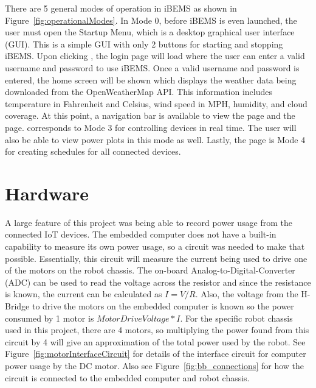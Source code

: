 There are 5 general modes of operation in iBEMS as shown in Figure~\ref{fig:operationalModes}. In Mode 0, before iBEMS is even launched, the user must open the Startup Menu, which is a desktop graphical user interface (GUI). This is a simple GUI with only 2 buttons for starting and stopping iBEMS. Upon clicking , the login page will load where the user can enter a valid username and password to use iBEMS. Once a valid username and password is entered, the home screen will be shown which displays the weather data being downloaded from the OpenWeatherMap API. This information includes temperature in Fahrenheit and Celsius, wind speed in MPH, humidity, and cloud coverage. At this point, a navigation bar is available to view the  page and the  page.  corresponds to Mode 3 for controlling devices in real time. The user will also be able to view power plots in this mode as well. Lastly, the  page is Mode 4 for creating schedules for all connected devices.

\section{Hardware}

A large feature of this project was being able to record power usage from the
connected IoT devices. The embedded computer does not have a built-in capability
to measure its own power usage, so a circuit was needed to make that
possible. Essentially, this circuit will measure the current being used to drive
one of the motors on the robot chassis. The on-board Analog-to-Digital-Converter
(ADC) can be used to read the voltage across the resistor and since the
resistance is known, the current can be calculated as $I = V/R$. Also, the
voltage from the H-Bridge to drive the motors on the embedded computer is known
so the power consumed by 1 motor is $Motor Drive Voltage * I$. For the specific
robot chassis used in this project, there are 4 motors, so multiplying the power
found from this circuit by 4 will give an approximation of the total power used
by the robot. See Figure~\ref{fig:motorInterfaceCircuit} for details of the interface
circuit for computer power usage by the DC motor. Also see Figure~\ref{fig:bb_connections} for how the circuit is connected to the embedded computer and robot chassis.

